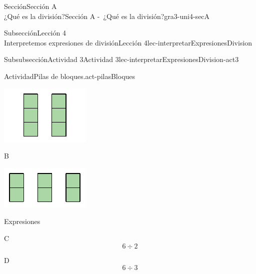 \begin{sectionptx}{Sección}{{\Large Sección A\\}¿Qué es la división?}{}{Sección A -~¿Qué es la división?}{}{}{gra3-uni4-secA}
\begin{subsectionptx}{Subsección}{{\normalsize Lección 4\\[-0.05cm]}Interpretemos expresiones de división}{}{Lección 4}{}{}{lec-interpretarExpresionesDivision}
\begin{subsubsectionptx}{Subsubsección}{Actividad 3}{}{Actividad 3}{}{}{lec-interpretarExpresionesDivision-act3}
\begin{activity}{Actividad}{Pilas de bloques.}{act-pilasBloques}
\begin{sidebyside}{2}{0.05}{0.05}{0.1}
\begin{sbspanel}{0.4}
\includegraphics[max width=\linewidth, center]{external/svg-source/tikz-file-149316.pdf}
\end{sbspanel}%
\begin{sbspanel}{0.4}%
B%
\par
\includegraphics[max width=\linewidth, center]{external/svg-source/tikz-file-149317.pdf}
\end{sbspanel}%
\end{sidebyside}%
\par
Expresiones%
\begin{sidebyside}{2}{0.05}{0.05}{0.1}%
\begin{sbspanel}{0.4}%
C%
\begin{equation*}
6\div 2
\end{equation*}
%
\end{sbspanel}%
\begin{sbspanel}{0.4}%
\par
D%
\begin{equation*}
6\div 3
\end{equation*}
%
\end{sbspanel}%
\end{sidebyside}%

\end{activity}
\end{subsubsectionptx}
\end{subsectionptx}
\end{sectionptx}
